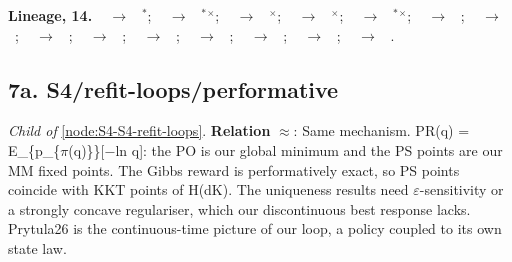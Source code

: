 \documentclass[10pt]{article}
\newcommand{\memb}[1]{\par\smallskip\textbf{#1}\quad}
\begin{document}
\memb{Lineage, 14.} {\footnotesize \citeauthor{Robinson-iterative51}~\citeyear{Robinson-iterative51} $\to$ \citeauthor{Lee-efficient19}~\citeyear{Lee-efficient19}$^\ast$; \citeauthor{Rosenthal-class73}~\citeyear{Rosenthal-class73} $\to$ \citeauthor{Monderer-potential96}~\citeyear{Monderer-potential96}$^\ast$$^\times$; \citeauthor{Monderer-potential96}~\citeyear{Monderer-potential96} $\to$ \citeauthor{Blume-statistical93}~\citeyear{Blume-statistical93}$^\times$; \citeauthor{Monderer-potential96}~\citeyear{Monderer-potential96} $\to$ \citeauthor{MondererShapley-fictitious96}~\citeyear{MondererShapley-fictitious96}$^\times$; \citeauthor{Monderer-potential96}~\citeyear{Monderer-potential96} $\to$ \citeauthor{Leonardos-global21}~\citeyear{Leonardos-global21}$^\ast$$^\times$; \citeauthor{Perdomo-performative20}~\citeyear{Perdomo-performative20} $\to$ \citeauthor{Gauthier-explaining26}~\citeyear{Gauthier-explaining26}; \citeauthor{Mandal-performative23}~\citeyear{Mandal-performative23} $\to$ \citeauthor{Wolf-reward25}~\citeyear{Wolf-reward25}; \citeauthor{Shumailov-curse23}~\citeyear{Shumailov-curse23} $\to$ \citeauthor{Hardt-retraining26}~\citeyear{Hardt-retraining26}; \citeauthor{Bertrand-stability23}~\citeyear{Bertrand-stability23} $\to$ \citeauthor{Dey-universality24}~\citeyear{Dey-universality24}; \citeauthor{Bertrand-stability23}~\citeyear{Bertrand-stability23} $\to$ \citeauthor{Kanabar-model25}~\citeyear{Kanabar-model25}; \citeauthor{Bertrand-stability23}~\citeyear{Bertrand-stability23} $\to$ \citeauthor{Suresh-rate24}~\citeyear{Suresh-rate24}; \citeauthor{Alemohammad-selfconsuming23}~\citeyear{Alemohammad-selfconsuming23} $\to$ \citeauthor{Hardt-retraining26}~\citeyear{Hardt-retraining26}; \citeauthor{Bertrand-stability23}~\citeyear{Bertrand-stability23} $\to$ \citeauthor{Hardt-retraining26}~\citeyear{Hardt-retraining26}; \citeauthor{Gerstgrasser-model24}~\citeyear{Gerstgrasser-model24} $\to$ \citeauthor{Hardt-retraining26}~\citeyear{Hardt-retraining26}.}

\subsection{7a. S4/refit-loops/performative}\label{node:S4-S4-refit-loops-performative}
\textit{Child of} \ref{node:S4-S4-refit-loops}. \textbf{Relation} $\approx$: Same mechanism. PR(q) = E\_\{p\_\{\ensuremath{\pi}(q)\}\}[\ensuremath{-}ln q]: the PO is our global minimum and the PS points are our MM fixed points. The Gibbs reward is performatively exact, so PS points coincide with KKT points of H(dK). The uniqueness results need \ensuremath{\varepsilon}-sensitivity or a strongly concave regulariser, which our discontinuous best response lacks. Prytula26 is the continuous-time picture of our loop, a policy coupled to its own state law.
\end{document}
